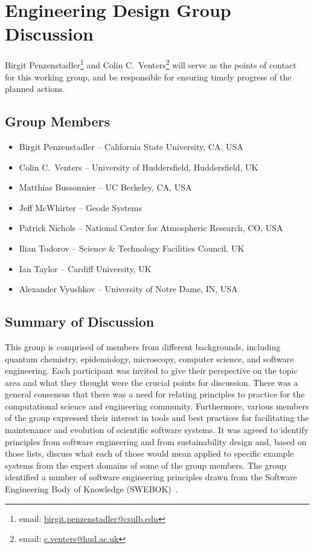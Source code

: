 \section{Engineering Design Group Discussion}
\label{sec:appendix_eng_design}

Birgit Penzenstadler\footnote{email:
\href{mailto:birgit.penzenstadler@csulb.edu}{birgit.penzenstadler@csulb.edu}}
and Colin C.\ Venters\footnote{email:
\href{mailto:c.venters@hud.ac.uk}{c.venters@hud.ac.uk}} will serve as the points
of contact for this working group, and be responsible for ensuring timely
progress of the planned actions.

\subsection{Group Members}

\begin{itemize}
\item Birgit Penzenstadler -- California State University, CA, USA
\item Colin C.\ Venters -- University of Huddersfield, Huddersfield, UK
\item Matthias Bussonnier -- UC Berkeley, CA, USA
\item Jeff McWhirter -- Geode Systems 
\item Patrick Nichols -- National Center for Atmospheric Research, CO, USA
\item Ilian Todorov -- Science \& Technology Facilities Council, UK
\item Ian Taylor -- Cardiff University, UK
\item Alexander Vyushkov -- University of Notre Dame, IN, USA
\end{itemize}

\subsection{Summary of Discussion}

This group is comprised  of members from different backgrounds, including quantum
chemistry, epidemiology, microscopy, computer science, and software engineering.
Each participant was invited to give their perspective on the topic area and
what they thought were the crucial points for discussion. There was a general
consensus that there was a need for relating principles to practice for the
computational science and engineering community. Furthermore, various members of
the group expressed their interest in tools and best practices for facilitating
the maintenance and evolution of scientific software systems. It was agreed to
identify principles from software engineering and from sustainability design
and, based on those lists, discuss what each of those would mean applied to
specific example systems from the expert domains of some of the group members.
The group identified a number of software engineering principles drawn from the
Software Engineering Body of Knowledge (SWEBOK)~\cite{swebokv3}.

